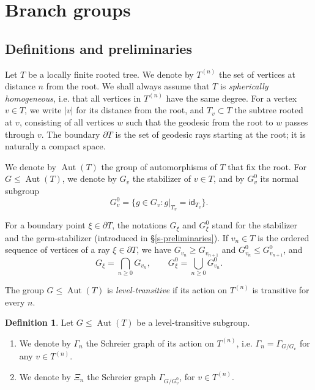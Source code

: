 \documentclass[11pt]{amsart}
\newcommand{\aut}{\ensuremath{\operatorname{Aut}}}%
\theoremstyle{definition}
\newtheorem{defin}{Definition}[section]
\theoremstyle{plain}
\newtheorem{main thm}{Theorem}
\theoremstyle{remark}
\theoremstyle{plain}
\begin{document}
	
\section{Branch groups} \label{s-branch}


	
\subsection{Definitions and preliminaries}
	
    
 \label{s-preliminaries-trees}
 Let $T$ be a locally finite rooted tree. We denote by $T^{(n)}$ the set of vertices at distance $n$ from the root. We shall always assume that $T$ is \emph{spherically homogeneous}, i.e. that all vertices in $T^{(n)}$ have the same degree. For a vertex $v\in T$, we write $|v|$ for its distance from the root, and  $T_v\subset T$ the subtree rooted at $v$, consisting of all vertices $w$ such that the geodesic from the root to $w$ passes through $v$. The boundary $\partial T$ is the set of geodesic rays starting at the root; it is naturally a compact space. 

 
 
 
 We denote by $\aut(T)$ the group of automorphisms of $T$ that fix the root.  For $G\le \aut(T)$, we denote by $G_v$ the stabilizer of $v\in T$, and by $G_v^0$ its normal subgroup
\[G_v^0=\{g\in G_v \colon g|_{T_v}=\mathsf{id}_{T_v}\}.\]

For a boundary point $\xi\in \partial T$, the notations $G_\xi$ and $G^0_\xi$ stand for the stabilizer and the germ-stabilizer (introduced in \S\ref{s-preliminaries}). If $v_n\in T$ is the ordered sequence of vertices of a ray $\xi\in \partial T$, we have   $G_{v_n}\ge G_{v_{n+1}}$ and $G_{v_n}^0\le G_{v_{n+1}}^0$, and
\begin{equation}
    \label{eq:stabilizerslimit}
    G_\xi=\bigcap_{n\ge 0}G_{v_n},\qquad G_\xi^0=\bigcup_{n\ge 0}G_{v_n}^0.
\end{equation}

 The group $G\le \aut(T)$ is \emph{level-transitive} if its action on $T^{(n)}$ is transitive for every $n$. \begin{defin} \label{d-graphs-trees}
     Let $G\le \aut(T)$ be a level-transitive subgroup. \begin{enumerate} 
     
     \item We denote by $\Gamma_n$ the Schreier graph of its action on $T^{(n)}$, i.e. $\Gamma_n=\Gamma_{G/G_v}$ for any $v\in T^{(n)}$.

     \item We denote by $\Xi_n$ the Schreier graph $\Gamma_{G/G^0_v}$, for $v\in T^{(n)}$.
     \end{enumerate}
 \end{defin}
\end{document}
